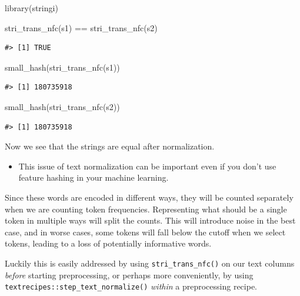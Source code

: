 \documentclass[
]{krantz}
\makeatletter
\newenvironment{Shaded}{\begin{snugshade}}{\end{snugshade}}
\newcommand{\FunctionTok}[1]{\textcolor[rgb]{0.00,0.00,0.00}{#1}}
\newcommand{\NormalTok}[1]{#1}
\newcommand{\SpecialCharTok}[1]{\textcolor[rgb]{0.00,0.00,0.00}{#1}}
\newenvironment{kframe}{%
\medskip{}
\setlength{\fboxsep}{.8em}
 \def\at@end@of@kframe{}%
 \ifinner\ifhmode%
  \def\at@end@of@kframe{\end{minipage}}%
  \begin{minipage}{\columnwidth}%
 \fi\fi%
 \def\FrameCommand##1{\hskip\@totalleftmargin \hskip-\fboxsep
 \colorbox{shadecolor}{##1}\hskip-\fboxsep
     \hskip-\linewidth \hskip-\@totalleftmargin \hskip\columnwidth}%
 \MakeFramed {\advance\hsize-\width
   \@totalleftmargin\z@ \linewidth\hsize
   \@setminipage}}%
 {\par\unskip\endMakeFramed%
 \at@end@of@kframe}
\renewenvironment{Shaded}{\begin{kframe}}{\end{kframe}}
\newenvironment{rmdblock}[1]
  {\begin{shaded*}
  \begin{itemize}[left = -1cm, labelsep = 1cm]
  \renewcommand{\labelitemi}{
    \raisebox{-.7\height}[0pt][0pt]{
      {\setkeys{Gin}{width=3em,keepaspectratio}\texttt{[image: images/\#1]}}
    }
  }
 
  \item
  }
  {
  \end{itemize}
  \end{shaded*}
  }
\newenvironment{rmdwarning}
  {\begin{rmdblock}{warning}}
  {\end{rmdblock}}
\makeatother
\begin{document}
\begin{Shaded}
\begin{Highlighting}[]
\FunctionTok{library}\NormalTok{(stringi)}

\FunctionTok{stri\_trans\_nfc}\NormalTok{(s1) }\SpecialCharTok{==} \FunctionTok{stri\_trans\_nfc}\NormalTok{(s2)}
\end{Highlighting}
\end{Shaded}

\begin{verbatim}
#> [1] TRUE
\end{verbatim}

\begin{Shaded}
\begin{Highlighting}[]
\FunctionTok{small\_hash}\NormalTok{(}\FunctionTok{stri\_trans\_nfc}\NormalTok{(s1))}
\end{Highlighting}
\end{Shaded}

\begin{verbatim}
#> [1] 180735918
\end{verbatim}

\begin{Shaded}
\begin{Highlighting}[]
\FunctionTok{small\_hash}\NormalTok{(}\FunctionTok{stri\_trans\_nfc}\NormalTok{(s2))}
\end{Highlighting}
\end{Shaded}

\begin{verbatim}
#> [1] 180735918
\end{verbatim}

Now we see that the strings are equal after normalization.

\begin{rmdwarning}
This issue of text normalization can be important even if you don't use
feature hashing in your machine learning.
\end{rmdwarning}


Since these words are encoded in different ways, they will be counted separately when we are counting token frequencies.
Representing what should be a single token in multiple ways will split the counts. This will introduce noise in the best case, and in worse cases, some tokens will fall below the cutoff when we select tokens, leading to a loss of potentially informative words.

Luckily this is easily addressed by using \texttt{stri\_trans\_nfc()} on our text columns \emph{before} starting preprocessing, or perhaps more conveniently, by using \texttt{textrecipes::step\_text\_normalize()} \emph{within} a preprocessing recipe.
\end{document}
